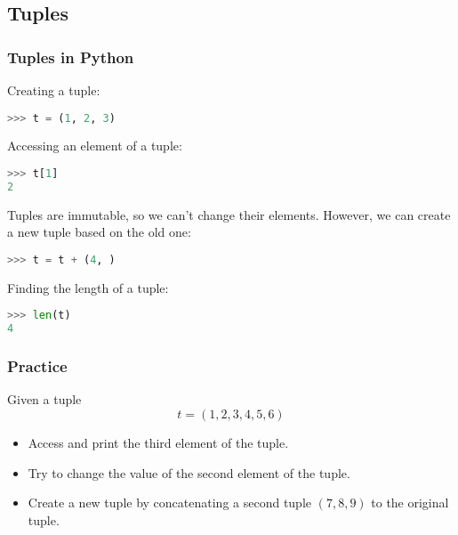 \subsection{Tuples}
\begin{frame}[fragile]
  \frametitle{Tuples in Python}
  Creating a tuple:
  \begin{lstlisting}[language=Python,numbers=none]
>>> t = (1, 2, 3)
  \end{lstlisting}\pause
  Accessing an element of a tuple:
  \begin{lstlisting}[language=Python,numbers=none]
>>> t[1]
2
  \end{lstlisting}\pause
  Tuples are immutable, so we can't change their elements. However, we can create a new tuple based on the old one:
  \begin{lstlisting}[language=Python,numbers=none]
>>> t = t + (4, )
  \end{lstlisting}\pause
  Finding the length of a tuple:
  \begin{lstlisting}[language=Python,numbers=none]
>>> len(t)
4
  \end{lstlisting}
\end{frame}

\begin{frame}[fragile]
  \frametitle{Practice}
  Given a tuple
  \[
     t = (1, 2, 3, 4, 5, 6)
  \]
  \begin{itemize}
   \item Access and print the third element of the tuple.
   \item Try to change the value of the second element of the tuple.
   \item Create a new tuple by concatenating a second tuple \((7, 8, 9)\) to the original tuple.
  \end{itemize}
 \end{frame}

